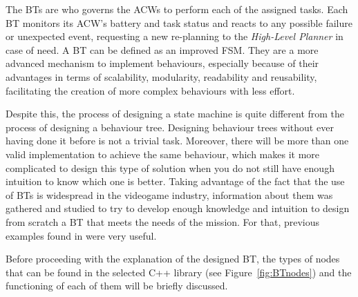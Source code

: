 \documentclass[fontsize=11pt, English=false, Español=true, Myfinal=true, twoside, numbers=noenddot]{scrbook}
\begin{document}
The \glspl{BT} are who governs the \glspl{ACW} to perform each of the assigned tasks. Each \gls{BT} monitors its \gls{ACW}'s battery and task status and reacts to any possible failure or unexpected event, requesting a new re-planning to the \emph{High-Level Planner} in case of need. A \gls{BT} can be defined as an improved \gls{FSM}. They are a more advanced mechanism to implement behaviours, especially because of their advantages in terms of scalability, modularity, readability and reusability, facilitating the creation of more complex behaviours with less effort.

Despite this, the process of designing a state machine is quite different from the process of designing a behaviour tree. Designing behaviour trees without ever having done it before is not a trivial task. Moreover, there will be more than one valid implementation to achieve the same behaviour, which makes it more complicated to design this type of solution when you do not still have enough intuition to know which one is better. Taking advantage of the fact that the use of \glspl{BT} is widespread in the videogame industry, information about them was gathered and studied to try to develop enough knowledge and intuition to design from scratch a \gls{BT} that meets the needs of the mission. For that, previous examples found in \cite{BT-CPP-doc, colledanchise2018behavior, BT-AI} were very useful.

Before proceeding with the explanation of the designed \gls{BT}, the types of nodes that can be found in the selected C++ library (see Figure~\ref{fig:BTnodes}) and the functioning of each of them will be briefly discussed.
\end{document}
